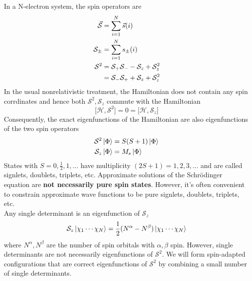 \documentclass[11pt]{article}
\begin{document}
In a N-electron system, the spin operators are
\begin{align}
    \vec{\mathcal{S}}&=\sum_{i=1}^{N}\vec{s}(i)\\
    \mathcal{S}_{\pm}&=\sum_{i=1}^{N}s_{\pm}(i)\\
    \mathcal{S}^2&=\mathcal{S}_+\mathcal{S}_- -\mathcal{S}_z+\mathcal{S}_z^2 \notag\\
    &=\mathcal{S}_-\mathcal{S}_+ +\mathcal{S}_z+\mathcal{S}_z^2
\end{align}
In the usual nonrelativistic treatment, the Hamiltonian does not contain any spin corrdinates and hence both
$\mathcal{S}^2, \mathcal{S}_z$ commute with the Hamiltonian
\begin{equation}
    \big[\mathcal{H},\mathcal{S}^2\big]=0=\big[\mathcal{H},\mathcal{S}_z\big]
\end{equation}
Consequently, the exact eigenfunctions of the Hamiltonian are also eigenfunctions of the two spin operators
\begin{align}
    \mathcal{S}^2\ket{\Phi}&=S(S+1)\ket{\Phi}\\
    \mathcal{S}_z\ket{\Phi}&=M_s\ket{\Phi}
\end{align}
States with $S=0,\frac{1}{2},1,\ldots$ have multiplicity $(2S+1)=1,2,3,\ldots$ and are called signlets, doublets,
triplets, etc. Approximate solutions of the Schr\"odinger equation are \textbf{not necessarily pure spin states}.
However, it's often convenient to constrain approximate  wave functions to be pure signlets, doublets, triplets, etc.\\
Any single determinant is an eigenfunction of $\mathcal{S}_z$
\begin{equation}
    \mathcal{S}_z\ket{\chi_1\cdots\chi_N}=\frac{1}{2}(N^\alpha-N^\beta)\ket{\chi_1\cdots\chi_N}
\end{equation}
where $N^\alpha, N^\beta$ are the number of spin orbitals with $\alpha, \beta$ spin. However, single determinants are not
necessarily eigenfunctions of $\mathcal{S}^2$. We will form spin-adapted configurations that are correct eigenfunctions of
$\mathcal{S}^2$ by combining a small number of single determinants.
\end{document}

